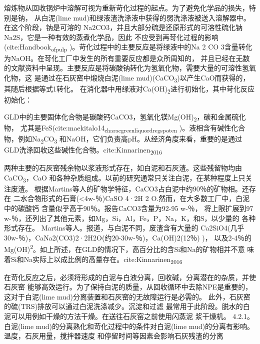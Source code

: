 \documentclass[11pt]{article}
\begin{document}
\nocite{poykio14_evaluat_bio_acces_non_proces, maekitalo14_charac_green_liquor_dregs_poten, jia13_use_amend_tailin_as_mine_waste_cover
, jia14_metal_mobil_tailin_cover_with, edmondson14_urban_cultiv_allot_maint_soil, buruberri15_prepar_clink_from_paper_pulp_indus_wastes,
 brunelle15_evaluat_impac_risin_fertil_prices_crop_yield, andreola11_model_simul_analy_react_system,
  ragnvaldsson14_novel_method_reduc_acid_mine, zhang15_lime_mud_from_paper_proces, zhang14_anaer_diges_food_waste_stabil}

熔炼物从回收锅炉中溶解可视为重新苛化过程的起点。为了避免化学品的损失，特别是钠，
从白泥(lime mud)和绿液渣洗涤液中获得的弱洗涤液被送入溶解器中。在这个阶段，钠是可溶的
Na2CO3，并且大部分硫是还原形式的可溶性硫化钠Na2S，它是一种有效的蒸煮化学品，因此
不应受到再苛化过程的影响(cite:Handbook\textsubscript{of}\textsubscript{pulp} )。苛化过程中的主要反应是将绿液中的Na 2 CO
3含量转化为NaOH。在苛化工厂中发生的所有重要反应都是众所周知的，
并且已经在无数的文献资料中呈现。主要反应是将碳酸钠转化为氢氧化物，需要大量的可溶性氢氧化物，这
是通过在石灰窑中煅烧白泥(lime mud)(CaCO\textsubscript{3})以产生CaO而获得的，其随后根据等式1转化。
在消化器中用绿液对Ca(OH)\textsubscript{2}进行初始化，其中苛化反应初始化：

GLD中的主要固体化合物是碳酸钙CaCO3，氢氧化镁Mg(OH)\textsubscript{2}，碳和金属硫化物，
尤其是FeS(cite:maekitalo14\textsubscript{charac}\textsubscript{green}\textsubscript{liquor}\textsubscript{dregs}\textsubscript{poten} )。液相含有碱性化合物，例如Na\textsubscript{2}CO\textsubscript{3}
和NaOH，它们负责高pH。从经济角度来看，重要的是通过GLD洗涤回收这些碱性化合物。cite:Kinnarinen\textsubscript{2016}

两种主要的石灰窑残余物以浆液形式存在，如白泥和石灰渣。这些残留物均由CaCO\textsubscript{3}，CaO
和各种杂质组成。以前的研究通常只关注白泥，在某种程度上只关注废渣。
根据Martins等人的矿物学特征，CaCO3占白泥中约90％的矿物相。还存在
二水合物形式的石膏(<4w-％)CaSO 4·2H 2 O.然而，在大多数工厂中，白泥中的碳酸钙
含量似乎高于90％。报告CaCO3含量为92-95 w-％，
将上限扩展到97 w-％，还列出了其他元素，如Mg，Si，Al，Fe，P，Na，K，和S，以少量的
各种形式存在。 Martins等人。报道，与白泥不同，废渣含有大量的
Ca2SiO4(几乎30w-％)，CaNa2(CO3)2·2H2O(约20-30w-％)，Ca(OH)2(12％) )，
以及2-4％的Mg(OH)\textsuperscript{2}。如上所述，在GLD的情况下，高百分比的含Si和Na的矿物相并不意
味着Si和Na实际上以成比例的高量存在。cite:Kinnarinen\textsubscript{2016}

在苛化反应之后，必须将形成的白泥与白液分离，回收碱，分离潜在的杂质，并使石灰窑
能够高效运行。为了保持白泥的质量，从回收循环中去除NPE是重要的，这对于白泥(lime mud)分离装置和石灰窑的无故障运行是必需的。
此外，石灰窑的硫(TRS)排放可以通过白泥洗涤减少。沉淀和过滤
最常用于此阶段。脱水的白泥可以用例如干燥的方法干燥。在送往石灰窑之前使用闪蒸泥
浆干燥机。 4.2.1。白泥(lime mud)的分离熟化和苛化过程中的条件对白泥(lime mud)的分离有影响。温度，石灰用量，搅拌器速度
和停留时间等因素会影响石灰残渣的分离
\end{document}
